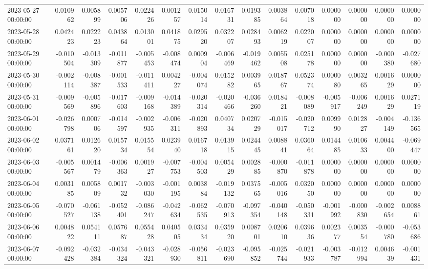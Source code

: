\begin{tabular}{lrrrrrrrrrrrrrr}
2023-05-27 00:00:00 & 0.010962 & 0.005899 & 0.005706 & 0.022426 & 0.001257 & 0.015014 & 0.016731 & 0.019385 & 0.003864 & 0.007018 & 0.000000 & 0.000000 & 0.000000 & 0.000000 \\
2023-05-28 00:00:00 & 0.042423 & 0.022223 & 0.043864 & 0.013001 & 0.041875 & 0.029520 & 0.032207 & 0.028493 & 0.006219 & 0.022007 & 0.000000 & 0.000000 & 0.000000 & 0.000000 \\
2023-05-29 00:00:00 & -0.010504 & -0.013309 & -0.011877 & -0.005453 & -0.008474 & 0.000904 & -0.006469 & -0.019462 & 0.005508 & 0.025178 & 0.000000 & 0.000000 & -0.000380 & -0.027680 \\
2023-05-30 00:00:00 & -0.002114 & -0.008387 & -0.001533 & -0.011411 & 0.004227 & -0.004074 & 0.015282 & 0.003965 & 0.018767 & 0.052374 & 0.000080 & 0.003265 & 0.001629 & 0.000000 \\
2023-05-31 00:00:00 & -0.009569 & -0.005896 & -0.017603 & -0.009168 & -0.014389 & -0.020314 & -0.020466 & -0.036260 & 0.018421 & -0.008089 & -0.005917 & -0.006249 & 0.001629 & 0.027119 \\
2023-06-01 00:00:00 & -0.026798 & 0.000706 & -0.014597 & -0.002935 & -0.006311 & -0.020893 & 0.040734 & 0.020729 & -0.015017 & -0.020712 & 0.009990 & 0.012827 & -0.004149 & -0.136565 \\
2023-06-02 00:00:00 & 0.037161 & 0.012620 & 0.015734 & 0.015554 & 0.023940 & 0.016718 & 0.013915 & 0.024445 & 0.008841 & 0.036064 & 0.014485 & 0.010633 & 0.004400 & -0.069447 \\
2023-06-03 00:00:00 & -0.005567 & 0.001479 & -0.006363 & 0.001927 & -0.007753 & -0.004503 & 0.005429 & 0.002885 & -0.000870 & -0.011878 & 0.000000 & 0.000000 & 0.000000 & 0.000000 \\
2023-06-04 00:00:00 & 0.003185 & 0.005809 & 0.001732 & -0.003030 & -0.001195 & 0.003884 & -0.019132 & 0.037565 & -0.005016 & 0.032050 & 0.000000 & 0.000000 & 0.000000 & 0.000000 \\
2023-06-05 00:00:00 & -0.070527 & -0.061138 & -0.052401 & -0.086247 & -0.042634 & -0.062535 & -0.070913 & -0.097354 & -0.040148 & -0.050331 & -0.001992 & -0.000830 & -0.002654 & 0.008861 \\
2023-06-06 00:00:00 & 0.004822 & 0.054111 & 0.057687 & 0.055428 & 0.040505 & 0.033434 & 0.035920 & 0.008701 & 0.020610 & 0.039636 & 0.002377 & 0.003554 & -0.000780 & -0.053686 \\
2023-06-07 00:00:00 & -0.092428 & -0.032384 & -0.034324 & -0.043321 & -0.028930 & -0.056811 & -0.023690 & -0.095852 & -0.025744 & -0.021933 & -0.003787 & -0.012994 & 0.004639 & -0.001431 \\

\end{tabular}
